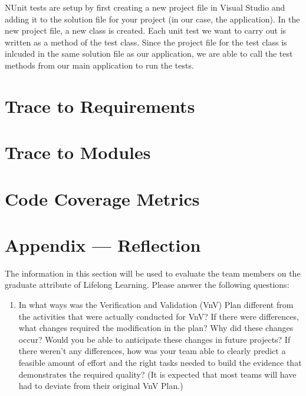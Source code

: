 \documentclass[12pt, titlepage]{article}
\begin{document}
\noindent NUnit tests are setup by first creating a new project file in Visual Studio and adding it to the solution file for your project (in our case, the application). In the new project file, a new class is created. Each unit test we want to carry out is written as a method of the test class. Since the project file for the test class is inlcuded in the same solution file as our application, we are able to call the test methods from our main application to run the tests.\\
		
\section{Trace to Requirements}
		
\section{Trace to Modules}		

\section{Code Coverage Metrics}




\newpage{}
\section*{Appendix --- Reflection}

The information in this section will be used to evaluate the team members on the
graduate attribute of Lifelong Learning.  Please answer the following questions:

\begin{enumerate}
  \item In what ways was the Verification and Validation (VnV) Plan different
  from the activities that were actually conducted for VnV?  If there were
  differences, what changes required the modification in the plan?  Why did
  these changes occur?  Would you be able to anticipate these changes in future projects?  If there weren't any differences, how was your team able to clearly predict a feasible amount of effort and the right tasks needed to build the evidence that demonstrates the required quality?  (It is expected that most teams will have had to deviate from their original VnV Plan.)
\end{enumerate}
\end{document}
